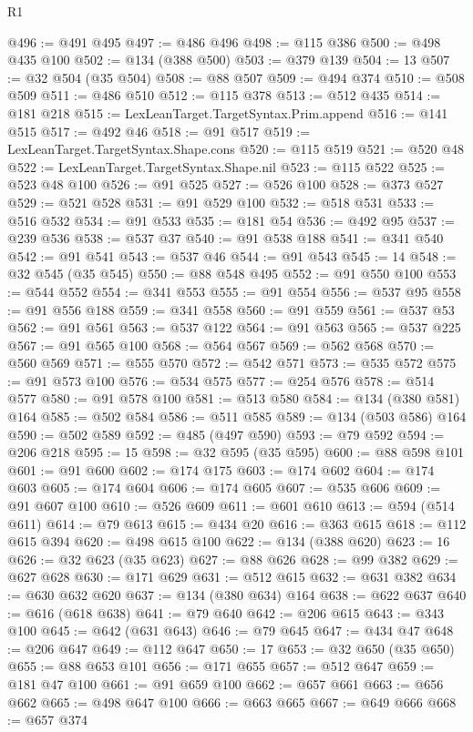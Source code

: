 \begin{lexlean}{R1}
\begin{coremodule}
{{{{{{{{{{{{{{{{{{{{{{{{{{{{{{{{{{{{{{{{{{{{{{{{{{{{{{{{{@496 := @491 @495
@497 := @486 @496
@498 := @115 @386
@500 := @498 @435 @100
@502 := @134 (@388 @500)
@503 := @379 @139
@504 := 13
@507 := @32 @504 (@35 @504)
@508 := @88 @507
@509 := @494 @374
@510 := @508 @509
@511 := @486 @510
@512 := @115 @378
@513 := @512 @435
@514 := @181 @218
@515 := LexLeanTarget.TargetSyntax.Prim.append
@516 := @141 @515
@517 := @492 @46
@518 := @91 @517
@519 := LexLeanTarget.TargetSyntax.Shape.cons
@520 := @115 @519
@521 := @520 @48
@522 := LexLeanTarget.TargetSyntax.Shape.nil
@523 := @115 @522
@525 := @523 @48 @100
@526 := @91 @525
@527 := @526 @100
@528 := @373 @527
@529 := @521 @528
@531 := @91 @529 @100
@532 := @518 @531
@533 := @516 @532
@534 := @91 @533
@535 := @181 @54
@536 := @492 @95
@537 := @239 @536
@538 := @537 @37
@540 := @91 @538 @188
@541 := @341 @540
@542 := @91 @541
@543 := @537 @46
@544 := @91 @543
@545 := 14
@548 := @32 @545 (@35 @545)
@550 := @88 @548 @495
@552 := @91 @550 @100
@553 := @544 @552
@554 := @341 @553
@555 := @91 @554
@556 := @537 @95
@558 := @91 @556 @188
@559 := @341 @558
@560 := @91 @559
@561 := @537 @53
@562 := @91 @561
@563 := @537 @122
@564 := @91 @563
@565 := @537 @225
@567 := @91 @565 @100
@568 := @564 @567
@569 := @562 @568
@570 := @560 @569
@571 := @555 @570
@572 := @542 @571
@573 := @535 @572
@575 := @91 @573 @100
@576 := @534 @575
@577 := @254 @576
@578 := @514 @577
@580 := @91 @578 @100
@581 := @513 @580
@584 := @134 (@380 @581) @164
@585 := @502 @584
@586 := @511 @585
@589 := @134 (@503 @586) @164
@590 := @502 @589
@592 := @485 (@497 @590)
@593 := @79 @592
@594 := @206 @218
@595 := 15
@598 := @32 @595 (@35 @595)
@600 := @88 @598 @101
@601 := @91 @600
@602 := @174 @175
@603 := @174 @602
@604 := @174 @603
@605 := @174 @604
@606 := @174 @605
@607 := @535 @606
@609 := @91 @607 @100
@610 := @526 @609
@611 := @601 @610
@613 := @594 (@514 @611)
@614 := @79 @613
@615 := @434 @20
@616 := @363 @615
@618 := @112 @615 @394
@620 := @498 @615 @100
@622 := @134 (@388 @620)
@623 := 16
@626 := @32 @623 (@35 @623)
@627 := @88 @626
@628 := @99 @382
@629 := @627 @628
@630 := @171 @629
@631 := @512 @615
@632 := @631 @382
@634 := @630 @632 @620
@637 := @134 (@380 @634) @164
@638 := @622 @637
@640 := @616 (@618 @638)
@641 := @79 @640
@642 := @206 @615
@643 := @343 @100
@645 := @642 (@631 @643)
@646 := @79 @645
@647 := @434 @47
@648 := @206 @647
@649 := @112 @647
@650 := 17
@653 := @32 @650 (@35 @650)
@655 := @88 @653 @101
@656 := @171 @655
@657 := @512 @647
@659 := @181 @47 @100
@661 := @91 @659 @100
@662 := @657 @661
@663 := @656 @662
@665 := @498 @647 @100
@666 := @663 @665
@667 := @649 @666
@668 := @657 @374
}}}}}}}}}}}}}}}}}}}}}}}}}}}}}}}}}}}}}}}}}}}}}}}}}}}}}}}}}
\end{coremodule}
\end{lexlean}
